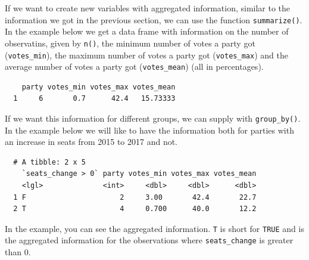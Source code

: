 \documentclass[12pt,oneside]{reedthesis}
\theoremstyle{definition}
\theoremstyle{definition}
\theoremstyle{definition}
\theoremstyle{remark}
\begin{document}
  If we want to create new variables with aggregated information, similar
  to the information we got in the previous section, we can use the
  function \texttt{summarize()}. In the example below we get a data frame
  with information on the number of observatins, given by \texttt{n()},
  the minimum number of votes a party got (\texttt{votes\_min}), the
  maximum number of votes a party got (\texttt{votes\_max}) and the
  average number of votes a party got (\texttt{votes\_mean}) (all in
  percentages).
  \begin{Shaded}
  \end{Shaded}
  \begin{verbatim}
    party votes_min votes_max votes_mean
  1     6       0.7      42.4   15.73333
  \end{verbatim}
  If we want this information for different groups, we can supply with
  \texttt{group\_by()}. In the example below we will like to have the
  information both for parties with an increase in seats from 2015 to 2017
  and not.
  \begin{Shaded}
  \end{Shaded}
  \begin{verbatim}
  # A tibble: 2 x 5
    `seats_change > 0` party votes_min votes_max votes_mean
    <lgl>              <int>     <dbl>     <dbl>      <dbl>
  1 F                      2     3.00       42.4       22.7
  2 T                      4     0.700      40.0       12.2
  \end{verbatim}
  In the example, you can see the aggregated information. \texttt{T} is
  short for \texttt{TRUE} and is the aggregated information for the
  observations where \texttt{seats\_change} is greater than 0.
  
\end{document}
